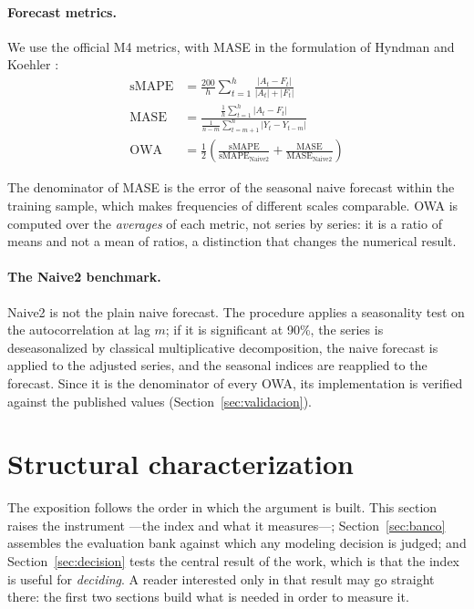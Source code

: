 \paragraph{Forecast metrics.} We use the official M4 metrics, with MASE in the formulation
of Hyndman and Koehler \cite{hyndman2006}:
\begin{align}
\mathrm{sMAPE} &= \frac{200}{h}\sum_{t=1}^{h}
   \frac{|A_t - F_t|}{|A_t| + |F_t|} \\[2mm]
\mathrm{MASE}  &= \frac{\frac{1}{h}\sum_{t=1}^{h}|A_t - F_t|}
   {\frac{1}{n-m}\sum_{t=m+1}^{n}|Y_t - Y_{t-m}|} \\[2mm]
\mathrm{OWA}   &= \frac{1}{2}\left(
   \frac{\mathrm{sMAPE}}{\mathrm{sMAPE}_{\mathrm{Naive2}}} +
   \frac{\mathrm{MASE}}{\mathrm{MASE}_{\mathrm{Naive2}}}\right)
\label{eq:owa}
\end{align}

The denominator of MASE is the error of the seasonal naive forecast within the training
sample, which makes frequencies of different scales comparable. OWA is computed over the
\emph{averages} of each metric, not series by series: it is a ratio of means and not a
mean of ratios, a distinction that changes the numerical result.

\paragraph{The Naive2 benchmark.} Naive2 is not the plain naive forecast. The procedure
applies a seasonality test on the autocorrelation at lag $m$; if it is significant at
90\%, the series is deseasonalized by classical multiplicative decomposition, the naive
forecast is applied to the adjusted series, and the seasonal indices are reapplied to the
forecast. Since it is the denominator of every OWA, its implementation is verified against
the published values (Section~\ref{sec:validacion}).


\section{Structural characterization}\label{sec:resultados}

The exposition follows the order in which the argument is built. This section raises the
instrument ---the index and what it measures---; Section~\ref{sec:banco} assembles the
evaluation bank against which any modeling decision is judged; and
Section~\ref{sec:decision} tests the central result of the work, which is that the index
is useful for \emph{deciding}. A reader interested only in that result may go straight
there: the first two sections build what is needed in order to measure it.

